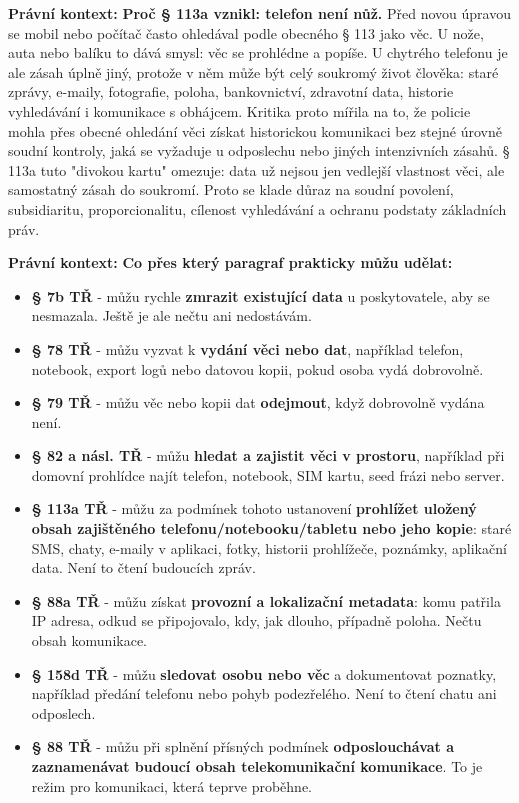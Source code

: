 \documentclass[11pt,a4paper]{article}
\newcommand{\pravobox}[1]{\begin{tcolorbox}[breakable,enhanced,colback=yellow!18,colframe=yellow!45!black,boxrule=0pt,arc=1mm,left=5pt,right=5pt,top=5pt,bottom=5pt,before skip=6pt,after skip=6pt]\textbf{Právní kontext:} #1\end{tcolorbox}}
\begin{document}
\pravobox{\textbf{Proč § 113a vznikl: telefon není nůž.} Před novou úpravou se mobil nebo počítač často ohledával podle obecného § 113 jako věc. U nože, auta nebo balíku to dává smysl: věc se prohlédne a popíše. U chytrého telefonu je ale zásah úplně jiný, protože v něm může být celý soukromý život člověka: staré zprávy, e-maily, fotografie, poloha, bankovnictví, zdravotní data, historie vyhledávání i komunikace s obhájcem. Kritika proto mířila na to, že policie mohla přes obecné ohledání věci získat historickou komunikaci bez stejné úrovně soudní kontroly, jaká se vyžaduje u odposlechu nebo jiných intenzivních zásahů. § 113a tuto "divokou kartu" omezuje: data už nejsou jen vedlejší vlastnost věci, ale samostatný zásah do soukromí. Proto se klade důraz na soudní povolení, subsidiaritu, proporcionalitu, cílenost vyhledávání a ochranu podstaty základních práv.}

\pravobox{\textbf{Co přes který paragraf prakticky můžu udělat:}
\begin{itemize}
  \item \textbf{§ 7b TŘ} - můžu rychle \textbf{zmrazit existující data} u poskytovatele, aby se nesmazala. Ještě je ale nečtu ani nedostávám.
  \item \textbf{§ 78 TŘ} - můžu vyzvat k \textbf{vydání věci nebo dat}, například telefon, notebook, export logů nebo datovou kopii, pokud osoba vydá dobrovolně.
  \item \textbf{§ 79 TŘ} - můžu věc nebo kopii dat \textbf{odejmout}, když dobrovolně vydána není.
  \item \textbf{§ 82 a násl. TŘ} - můžu \textbf{hledat a zajistit věci v prostoru}, například při domovní prohlídce najít telefon, notebook, SIM kartu, seed frázi nebo server.
  \item \textbf{§ 113a TŘ} - můžu za podmínek tohoto ustanovení \textbf{prohlížet uložený obsah zajištěného telefonu/notebooku/tabletu nebo jeho kopie}: staré SMS, chaty, e-maily v aplikaci, fotky, historii prohlížeče, poznámky, aplikační data. Není to čtení budoucích zpráv.
  \item \textbf{§ 88a TŘ} - můžu získat \textbf{provozní a lokalizační metadata}: komu patřila IP adresa, odkud se připojovalo, kdy, jak dlouho, případně poloha. Nečtu obsah komunikace.
  \item \textbf{§ 158d TŘ} - můžu \textbf{sledovat osobu nebo věc} a dokumentovat poznatky, například předání telefonu nebo pohyb podezřelého. Není to čtení chatu ani odposlech.
  \item \textbf{§ 88 TŘ} - můžu při splnění přísných podmínek \textbf{odposlouchávat a zaznamenávat budoucí obsah telekomunikační komunikace}. To je režim pro komunikaci, která teprve proběhne.
\end{itemize}}
\end{document}
